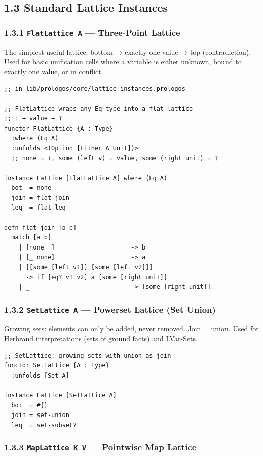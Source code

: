 \documentclass[11pt]{article}
\begin{document}
\subsection{1.3 Standard Lattice Instances}
\label{sec:org746813f}

\subsubsection{1.3.1 \texttt{FlatLattice A} — Three-Point Lattice}
\label{sec:org6874000}

The simplest useful lattice: bottom → exactly one value → top (contradiction).
Used for basic unification cells where a variable is either unknown, bound to
exactly one value, or in conflict.

\begin{verbatim}
;; in lib/prologos/core/lattice-instances.prologos

;; FlatLattice wraps any Eq type into a flat lattice
;; ⊥ → value → ⊤
functor FlatLattice {A : Type}
  :where (Eq A)
  :unfolds <(Option [Either A Unit])>
  ;; none = ⊥, some (left v) = value, some (right unit) = ⊤

instance Lattice [FlatLattice A] where (Eq A)
  bot  = none
  join = flat-join
  leq  = flat-leq

defn flat-join [a b]
  match [a b]
    | [none _]                     -> b
    | [_ none]                     -> a
    | [[some [left v1]] [some [left v2]]]
      -> if [eq? v1 v2] a [some [right unit]]
    | _                            -> [some [right unit]]
\end{verbatim}
\subsubsection{1.3.2 \texttt{SetLattice A} — Powerset Lattice (Set Union)}
\label{sec:orgca33ff0}

Growing sets: elements can only be added, never removed. Join = union.
Used for Herbrand interpretations (sets of ground facts) and LVar-Sets.

\begin{verbatim}
;; SetLattice: growing sets with union as join
functor SetLattice {A : Type}
  :unfolds [Set A]

instance Lattice [SetLattice A]
  bot  = #{}
  join = set-union
  leq  = set-subset?
\end{verbatim}
\subsubsection{1.3.3 \texttt{MapLattice K V} — Pointwise Map Lattice}
\label{sec:orgf157189}
\end{document}
